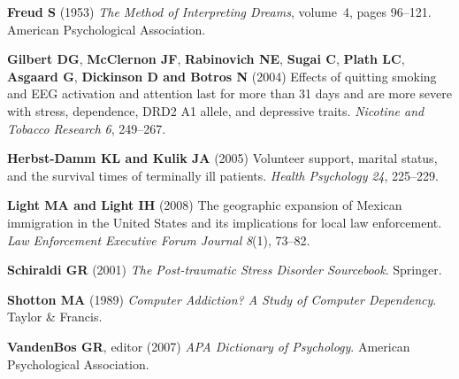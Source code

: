 \documentclass{CUP-JNL-DAP}%
\begin{document}
\begin{Backmatter}
%
%

\begin{thebibliography}{}

\textbf{Freud S} (1953) \textit{The Method of Interpreting Dreams}, volume~4, pages 96--121.
 American Psychological Association.

\textbf{Gilbert DG}, \textbf{McClernon JF}, \textbf{Rabinovich NE}, \textbf{Sugai C}, \textbf{Plath LC},
  \textbf{Asgaard G}, \textbf{Dickinson D and Botros N} (2004)
 Effects of quitting smoking and {EEG} activation and attention last
  for more than 31 days and are more severe with stress, dependence, {DRD2 A1}
  allele, and depressive traits. \textit{Nicotine and Tobacco Research} \textit{6}, 249--267.

\textbf{Herbst-Damm KL and Kulik JA} (2005)
Volunteer support, marital status, and the survival times of terminally ill patients.
\textit{Health Psychology} \textit{24}, 225--229.

\textbf{Light MA and Light IH} (2008)
 The geographic expansion of {M}exican immigration in the {U}nited {S}tates and its implications for local law enforcement. \textit{Law Enforcement Executive Forum Journal} \textit{8}(1), 73--82.

\textbf{Schiraldi GR} (2001) \textit{The Post-traumatic Stress Disorder Sourcebook}. Springer.

\textbf{Shotton MA} (1989) \textit{Computer Addiction? {A} Study of Computer Dependency}.  Taylor \& Francis.

\textbf{VandenBos GR}, editor (2007) \textit{APA Dictionary of Psychology}. American Psychological Association.
\end{thebibliography}

\end{Backmatter}
\end{document}
